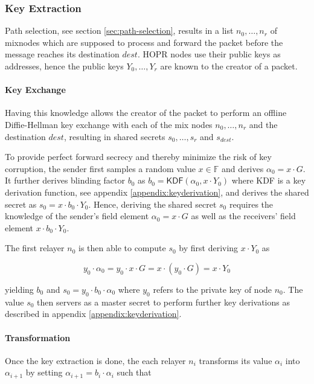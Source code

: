 \subsubsection{Key Extraction}
\label{sec:sphinx:keyderivation}

Path selection, see section \ref{sec:path-selection}, results in a list $n_0, \dots, n_r$ of mixnodes which are supposed to process and forward the packet before the message reaches its destination $dest$. HOPR nodes use their public keys as addresses, hence the public keys $Y_0, \dots , Y_r$ are known to the creator of a packet.

\paragraph{Key Exchange}

Having this knowledge allows the creator of the packet to perform an offline Diffie-Hellman key exchange with each of the mix nodes $n_0 , \dots , n_r$ and the destination $dest$, resulting in shared secrets $s_0, \dots , s_r$ and $s_{dest}$.

To provide perfect forward secrecy and thereby minimize the risk of key corruption, the sender first samples a random value $x \in \mathbb{F}$ and derives $\alpha_0 = x \cdot G$. It further derives blinding factor $b_0$ as $b_0 = \mathsf{KDF}(\alpha_0, x \cdot Y_0)$ where \textsf{KDF} is a key derivation function, see appendix \ref{appendix:keyderivation}, and derives the shared secret as $s_0 = x \cdot b_0 \cdot Y_0$. Hence, deriving the shared secret $s_0$ requires the knowledge of the sender's field element $\alpha_0 = x \cdot G$ as well as the receivers' field element $x \cdot b_0 \cdot Y_0$.

The first relayer $n_0$ is then able to compute $s_0$ by first deriving $x \cdot Y_0$ as

$$y_0 \cdot \alpha_0 = y_0 \cdot x \cdot G = x \cdot ( y_0 \cdot G) = x \cdot Y_0$$

yielding $b_0$ and $s_0 = y_0 \cdot b_0 \cdot \alpha_0$ where $y_0$ refers to the private key of node $n_0$. The value $s_0$ then servers as a master secret to perform further key derivations as described in appendix \ref{appendix:keyderivation}.

\paragraph{Transformation}

Once the key extraction is done, the each relayer $n_i$ transforms its value $\alpha_i$ into $\alpha_{i+1}$ by setting $\alpha_{i+1} = b_i \cdot \alpha_i$ such that


